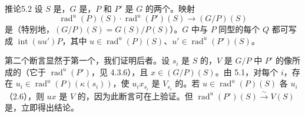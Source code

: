 \begin{SGAresult}{推论}{5.2}
设 $S$ 是，$G$ 是，$P$ 和 $P'$ 是 $G$ 的两个。映射
\[
 \operatorname{rad}^{u}(P)(S)\cdot\operatorname{rad}^{u}(P')(S)\longrightarrow(G/P)(S)
\]
是（特别地，$(G/P)(S)=G(S)/P(S)$）。$G$ 中与 $P$ 同型的每个 $Q$ 都可写成 $\operatorname{int}(uu')P$，其中 $u\in\operatorname{rad}^{u}(P)(S)$、$u'\in\operatorname{rad}^{u}(P')(S)$。
\end{SGAresult}
第二个断言显然于第一个，我们证明后者。设 $s_i$ 是 $S$ 的，$V$ 是 $G/P$ 中 $P'$ 的像所成的（它于 $\operatorname{rad}^{u}(P')$，见 4.3.6），且 $x\in(G/P)(S)$。由 5.1，对每个 $i$，存在 $u_i\in\operatorname{rad}^{u}(P)(\kappa(s_i))$，使 $u_ix_{s_i}$ 是 $V_{s_i}$ 的。若 $u\in\operatorname{rad}^{u}(P)(S)$ 各 $u_i$（2.6），则 $ux$ 是 $V$ 的，因为此断言可在上验证。但 $\operatorname{rad}^{u}(P')(S)\xrightarrow{\sim}V(S)$ 是，立即得出结论。

